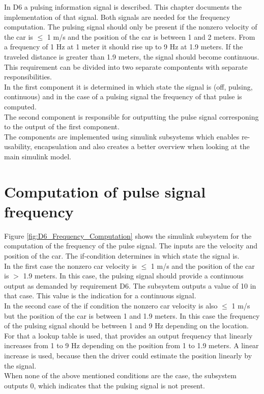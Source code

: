 In D6 a pulsing information signal is described. This chapter documents the implementation of that signal.
Both signals are needed for the frequency computation.
The pulsing signal should only be present if the nonzero velocity of the car is $\leq$ 1 m/s and the position of the car is between 1 and 2 meters. From a frequency of 1 Hz at 1 meter it should rise up to 9 Hz at 1.9 meters. If the traveled distance is greater than 1.9 meters, the signal should become continuous.\\
This requirement can be divided into two separate compontents with separate responsibilities.\\
In the first component it is determined in which state the signal is (off, pulsing, continuous) and in the case of a pulsing signal the frequency of that pulse is computed.\\
The second component is responsible for outputting the pulse signal corresponing to the output of the first component.\\
The components are implemented using simulink subsystems which enables re-usability, encapsulation and also creates a better overview when looking at the main simulink model.\\
\section{Computation of pulse signal frequency}\label{sec:D6Frequency}
Figure \ref{fig:D6_Frequency_Computation} shows the simulink subsystem for the computation of the frequency of the pulse signal.
The inputs are the velocity and position of the car.
The if-condition determines in which state the signal is.\\
In the first case the nonzero car velocity is $\leq$ 1 m/s and the position of the car is $>$ 1.9 meters.
In this case, the pulsing signal should provide a continuous output as demanded by requirement D6.
The subsystem outputs a value of 10 in that case.
This value is the indication for a continuous signal.\\
In the second case of the if condition the nonzero car velocity is also $\leq$ 1 m/s but the position of the car is between 1 and 1.9 meters.
In this case the frequency of the pulsing signal should be between 1 and 9 Hz depending on the location.
For that a lookup table is used, that provides an output frequency that linearly increases from 1 to 9 Hz depending on the position from 1 to 1.9 meters. A linear increase is used, because then the driver could estimate the position linearly by the signal.\\
When none of the above mentioned conditions are the case, the subsystem outputs 0, which indicates that the pulsing signal is not present.

